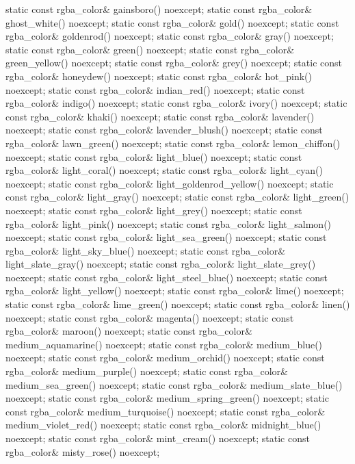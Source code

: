 \begin{codeblock}
{{    static const rgba_color& gainsboro() noexcept;
    static const rgba_color& ghost_white() noexcept;
    static const rgba_color& gold() noexcept;
    static const rgba_color& goldenrod() noexcept;
    static const rgba_color& gray() noexcept;
    static const rgba_color& green() noexcept;
    static const rgba_color& green_yellow() noexcept;
    static const rgba_color& grey() noexcept;
    static const rgba_color& honeydew() noexcept;
    static const rgba_color& hot_pink() noexcept;
    static const rgba_color& indian_red() noexcept;
    static const rgba_color& indigo() noexcept;
    static const rgba_color& ivory() noexcept;
    static const rgba_color& khaki() noexcept;
    static const rgba_color& lavender() noexcept;
    static const rgba_color& lavender_blush() noexcept;
    static const rgba_color& lawn_green() noexcept;
    static const rgba_color& lemon_chiffon() noexcept;
    static const rgba_color& light_blue() noexcept;
    static const rgba_color& light_coral() noexcept;
    static const rgba_color& light_cyan() noexcept;
    static const rgba_color& light_goldenrod_yellow() noexcept;
    static const rgba_color& light_gray() noexcept;
    static const rgba_color& light_green() noexcept;
    static const rgba_color& light_grey() noexcept;
    static const rgba_color& light_pink() noexcept;
    static const rgba_color& light_salmon() noexcept;
    static const rgba_color& light_sea_green() noexcept;
    static const rgba_color& light_sky_blue() noexcept;
    static const rgba_color& light_slate_gray() noexcept;
    static const rgba_color& light_slate_grey() noexcept;
    static const rgba_color& light_steel_blue() noexcept;
    static const rgba_color& light_yellow() noexcept;
    static const rgba_color& lime() noexcept;
    static const rgba_color& lime_green() noexcept;
    static const rgba_color& linen() noexcept;
    static const rgba_color& magenta() noexcept;
    static const rgba_color& maroon() noexcept;
    static const rgba_color& medium_aquamarine() noexcept;
    static const rgba_color& medium_blue() noexcept;
    static const rgba_color& medium_orchid() noexcept;
    static const rgba_color& medium_purple() noexcept;
    static const rgba_color& medium_sea_green() noexcept;
    static const rgba_color& medium_slate_blue() noexcept;
    static const rgba_color& medium_spring_green() noexcept;
    static const rgba_color& medium_turquoise() noexcept;
    static const rgba_color& medium_violet_red() noexcept;
    static const rgba_color& midnight_blue() noexcept;
    static const rgba_color& mint_cream() noexcept;
    static const rgba_color& misty_rose() noexcept;
}}
\end{codeblock}
